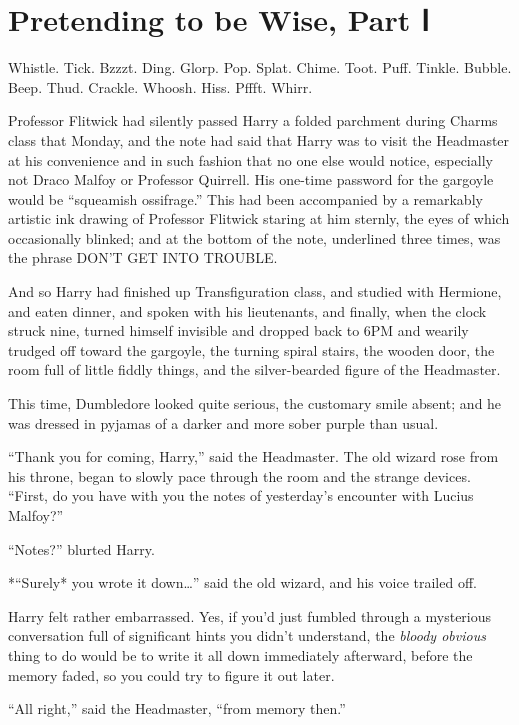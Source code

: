 \chapter{Pretending to be Wise, Part
Ⅰ}\label{pretending-to-be-wise-part}

Whistle. Tick. Bzzzt. Ding. Glorp. Pop. Splat. Chime. Toot. Puff.
Tinkle. Bubble. Beep. Thud. Crackle. Whoosh. Hiss. Pffft. Whirr.

Professor Flitwick had silently passed Harry a folded parchment during
Charms class that Monday, and the note had said that Harry was to visit
the Headmaster at his convenience and in such fashion that no one else
would notice, especially not Draco Malfoy or Professor Quirrell. His
one-time password for the gargoyle would be ``squeamish ossifrage.''
This had been accompanied by a remarkably artistic ink drawing of
Professor Flitwick staring at him sternly, the eyes of which
occasionally blinked; and at the bottom of the note, underlined three
times, was the phrase DON'T GET INTO TROUBLE.

And so Harry had finished up Transfiguration class, and studied with
Hermione, and eaten dinner, and spoken with his lieutenants, and
finally, when the clock struck nine, turned himself invisible and
dropped back to 6PM and wearily trudged off toward the gargoyle, the
turning spiral stairs, the wooden door, the room full of little fiddly
things, and the silver-bearded figure of the Headmaster.

This time, Dumbledore looked quite serious, the customary smile absent;
and he was dressed in pyjamas of a darker and more sober purple than
usual.

``Thank you for coming, Harry,'' said the Headmaster. The old wizard
rose from his throne, began to slowly pace through the room and the
strange devices. ``First, do you have with you the notes of yesterday's
encounter with Lucius Malfoy?''

``Notes?'' blurted Harry.

*``Surely* you wrote it down\ldots{}'' said the old wizard, and his
voice trailed off.

Harry felt rather embarrassed. Yes, if you'd just fumbled through a
mysterious conversation full of significant hints you didn't understand,
the \emph{bloody obvious} thing to do would be to write it all down
immediately afterward, before the memory faded, so you could try to
figure it out later.

``All right,'' said the Headmaster, ``from memory then.''

